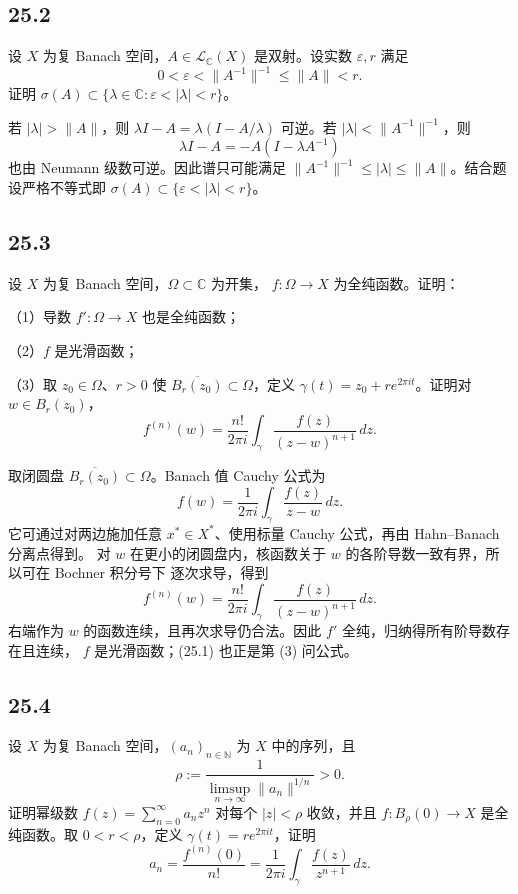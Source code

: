 \subsection*{25.2}
\begin{problem}
设 $X$ 为复 Banach 空间，$A\in\mathcal L_{\mathbb C}(X)$ 是双射。设实数
$\varepsilon,r$ 满足
\[
 0<\varepsilon<\|A^{-1}\|^{-1}\leq\|A\|<r.
\]
证明
$\sigma(A)\subset\{\lambda\in\mathbb C:\varepsilon<|\lambda|<r\}$。
\end{problem}

若 $|\lambda|>\|A\|$，则
$\lambda I-A=\lambda(I-A/\lambda)$ 可逆。若
$|\lambda|<\|A^{-1}\|^{-1}$，则
\[
 \lambda I-A=-A(I-\lambda A^{-1})
\]
也由 Neumann 级数可逆。因此谱只可能满足
$\|A^{-1}\|^{-1}\leq|\lambda|\leq\|A\|$。结合题设严格不等式即
$\sigma(A)\subset\{\varepsilon<|\lambda|<r\}$。

\subsection*{25.3}
\begin{problem}
设 $X$ 为复 Banach 空间，$\Omega\subset\mathbb C$ 为开集，
$f:\Omega\to X$ 为全纯函数。证明：

（1）导数 $f':\Omega\to X$ 也是全纯函数；

（2）$f$ 是光滑函数；

（3）取 $z_0\in\Omega$、$r>0$ 使 $\overline{B_r(z_0)}\subset\Omega$，定义
$\gamma(t)=z_0+re^{2\pi it}$。证明对 $w\in B_r(z_0)$，
\[
 f^{(n)}(w)=\frac{n!}{2\pi i}
 \int_\gamma\frac{f(z)}{(z-w)^{n+1}}\,dz.
\]
\end{problem}

取闭圆盘 $\overline{B_r(z_0)}\subset\Omega$。Banach 值 Cauchy 公式为
\[
 f(w)=\frac1{2\pi i}\int_\gamma\frac{f(z)}{z-w}\,dz.
\]
它可通过对两边施加任意 $x^*\in X^*$、使用标量 Cauchy 公式，再由 Hahn--Banach 分离点得到。
对 $w$ 在更小的闭圆盘内，核函数关于 $w$ 的各阶导数一致有界，所以可在 Bochner 积分号下
逐次求导，得到
\[
 f^{(n)}(w)=\frac{n!}{2\pi i}\int_\gamma\frac{f(z)}{(z-w)^{n+1}}\,dz. \tag{25.1}
\]
右端作为 $w$ 的函数连续，且再次求导仍合法。因此 $f'$ 全纯，归纳得所有阶导数存在且连续，
$f$ 是光滑函数；(25.1) 也正是第 (3) 问公式。

\subsection*{25.4}
\begin{problem}
设 $X$ 为复 Banach 空间，$(a_n)_{n\in\mathbb N}$ 为 $X$ 中的序列，且
\[
 \rho:=\frac{1}{\limsup_{n\to\infty}\|a_n\|^{1/n}}>0.
\]
证明幂级数
$f(z)=\sum_{n=0}^{\infty}a_nz^n$ 对每个 $|z|<\rho$ 收敛，并且
$f:B_\rho(0)\to X$ 是全纯函数。取 $0<r<\rho$，定义
$\gamma(t)=re^{2\pi it}$，证明
\[
 a_n=\frac{f^{(n)}(0)}{n!}
 =\frac1{2\pi i}\int_\gamma\frac{f(z)}{z^{n+1}}\,dz.
\]
\end{problem}

